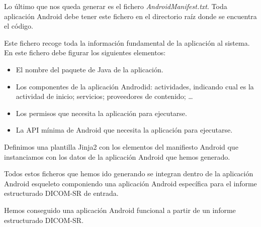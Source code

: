 Lo último que nos queda generar es el fichero \emph{AndroidManifest.txt}. Toda aplicación Android debe tener este fichero en el directorio raíz donde se encuentra el código.\par
Este fichero recoge toda la información fundamental de la aplicación al sistema. En este fichero debe figurar los siguientes elementos:
\begin{itemize}
\item El nombre del paquete de Java de la aplicación.
\item Los componentes de la aplicación Androdid: actividades, indicando cual es la actividad de inicio; servicios; proveedores de contenido; \ldots
\item Los permisos que necesita la aplicación para ejecutarse. 
\item La API mínima de Android que necesita la aplicación para ejecutarse. 
\end{itemize}
Definimos una plantilla Jinja2 con los elementos del manifiesto Android que instanciamos con los datos de la aplicación Android que hemos generado.\bigskip \par

Todos estos ficheros que hemos ido generando se integran dentro de la aplicación Android esqueleto componiendo una aplicación Android específica para el informe estructurado DICOM-SR de entrada.\par
Hemos conseguido una aplicación Android funcional a partir de un informe estructurado DICOM-SR.
